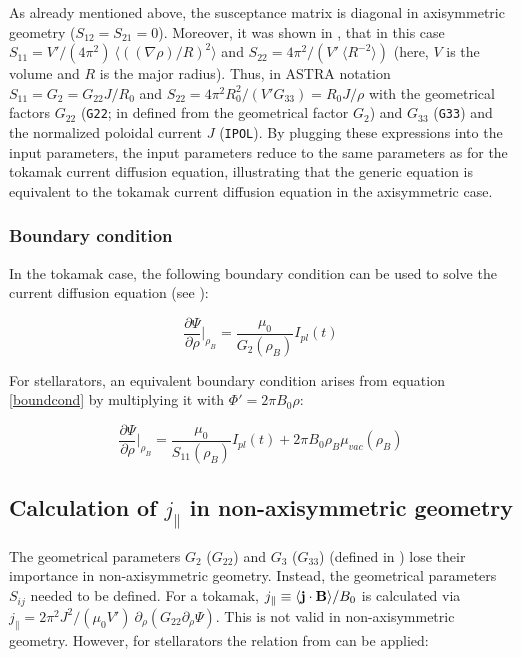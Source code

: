 As already mentioned above, the susceptance matrix is diagonal in axisymmetric geometry ($S_{12} = S_{21} = 0$). Moreover, it was shown in \cite{strand2001}, that in this case $S_{11} = V'/(4\pi^2) \ \langle ((\nabla \rho)/R)^2 \rangle$ and $S_{22} = 4\pi^2/(V' \ \langle R^{-2} \rangle)$ (here, $V$ is the volume and $R$ is the major radius). Thus, in ASTRA notation $S_{11} = G_2 = G_{22} J/R_0$ and $S_{22} = 4 \pi^2 R^2_0/(V' G_{33}) = R_0 J/\rho$ with the geometrical factors $G_{22}$ (\texttt{G22}; in \cite{ASTRAmanual} defined from the geometrical factor $G_2$) and $G_{33}$ (\texttt{G33}) and the normalized poloidal current $J$ (\texttt{IPOL}). By plugging these expressions into the input parameters, the input parameters reduce to the same parameters as for the tokamak current diffusion equation, illustrating that the generic equation is equivalent to the tokamak current diffusion equation in the axisymmetric case.

\subsubsection{Boundary condition}

In the tokamak case, the following boundary condition can be used to solve the current diffusion equation (see \cite{ASTRAmanual}):

\begin{equation}
\frac{\partial \Psi}{\partial \rho}\bigg|_{\rho_B} = \frac{\mu_0}{G_2(\rho_B)}I_{pl}(t)
\end{equation}

For stellarators, an equivalent boundary condition arises from equation \ref{boundcond} by multiplying it with $\Phi'=2\pi B_0 \rho$:

\begin{equation}
\frac{\partial \Psi}{\partial \rho}\bigg|_{\rho_B} = \frac{\mu_0}{S_{11}(\rho_B)}I_{pl}(t) + 2\pi B_0 \rho_B \mu_{vac}(\rho_B)
\end{equation}



\subsection{Calculation of $j_\parallel$ in non-axisymmetric geometry}

The geometrical parameters $G_2$ ($G_{22}$) and $G_3$ ($G_{33}$) (defined in \cite{ASTRAmanual}) lose their importance in non-axisymmetric geometry. Instead, the geometrical parameters $S_{ij}$ needed to be defined. For a tokamak, $j_\parallel \equiv \langle \textbf{j}\cdot\mathbf{B} \rangle/B_0$ is calculated via $j_\parallel = 2\pi^2 J^2/(\mu_0 V') \ \partial_\rho(G_{22}\partial_\rho \Psi)$. This is not valid in non-axisymmetric geometry. However, for stellarators the relation from \cite{strand2001} can be applied:

